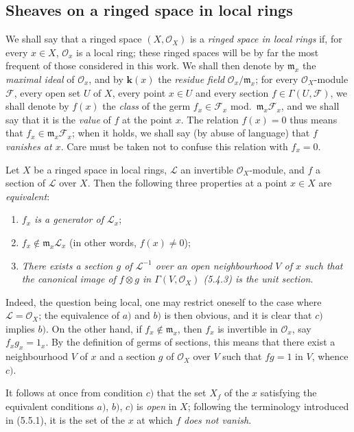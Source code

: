 \subsection{Sheaves on a ringed space in local rings}
\label{subsection:0.5.5}

\begin{env}[5.5.1]
\label{0.5.5.1}
We shall say that a ringed space $(X,\mathcal{O}_X)$ is a \emph{ringed
space in local rings} if, for every $x\in X$, $\mathcal{O}_x$ is a
local ring; these ringed spaces will be by far the most frequent of those
considered in this work. We shall then denote by
$\mathfrak{m}_x$ the \emph{maximal ideal} of $\mathcal{O}_x$, and by $\boldsymbol{k}(x)$ the
\emph{residue field} $\mathcal{O}_x/\mathfrak{m}_x$; for every
$\mathcal{O}_X$-module $\mathcal{F}$, every open set $U$ of $X$, every point
$x\in U$ and every section $f\in\Gamma(U,\mathcal{F})$, we shall denote by
$f(x)$ the \emph{class} of the germ
$f_x\in\mathcal{F}_x$ mod.~$\mathfrak{m}_x\mathcal{F}_x$, and we shall say that
it is the \emph{value} of $f$ at the point $x$. The relation $f(x)=0$ thus
means that $f_x\in\mathfrak{m}_x\mathcal{F}_x$; when it holds, we shall say
(by abuse of language) that $f$ \emph{vanishes at $x$}. Care must be taken not to
confuse this relation with $f_x=0$.
\end{env}

\begin{env}[5.5.2]
\label{0.5.5.2}
Let $X$ be a ringed space in local rings, $\mathcal{L}$ an
invertible $\mathcal{O}_X$-module, and $f$ a section of $\mathcal{L}$ over
$X$. Then the following three properties at a point $x\in X$ are
\emph{equivalent}:
\begin{enumerate}
  \item[a)] \emph{$f_x$ is a generator of $\mathcal{L}_x$};
  \item[b)] \emph{$f_x\notin\mathfrak{m}_x\mathcal{L}_x$} (in other words,
    $f(x)\neq0$);
  \item[c)] \emph{There exists a section $g$ of $\mathcal{L}^{-1}$ over
    an open neighbourhood $V$ of $x$ such that the canonical image of $f\otimes
    g$ in $\Gamma(V,\mathcal{O}_X)$ \textup{(5.4.3)} is the unit section}.
\end{enumerate}

Indeed, the question being local, one may restrict oneself to the case where
$\mathcal{L}=\mathcal{O}_X$; the equivalence of $a)$ and $b)$ is then
obvious, and it is clear that $c)$ implies $b)$. On the other hand, if
$f_x\notin\mathfrak{m}_x$, then $f_x$ is invertible in $\mathcal{O}_x$, say
$f_xg_x=1_x$. By the definition of germs of sections, this means that there
exist a neighbourhood $V$ of $x$ and a section $g$ of $\mathcal{O}_X$ over
$V$ such that $fg=1$ in $V$, whence $c)$.

It follows at once from condition $c)$ that the set $X_f$ of the $x$
satisfying the equivalent conditions $a)$, $b)$, $c)$ is \emph{open} in
$X$; following the terminology introduced in (5.5.1), it is the set of the
$x$ at which $f$ \emph{does not vanish}.
\end{env}

